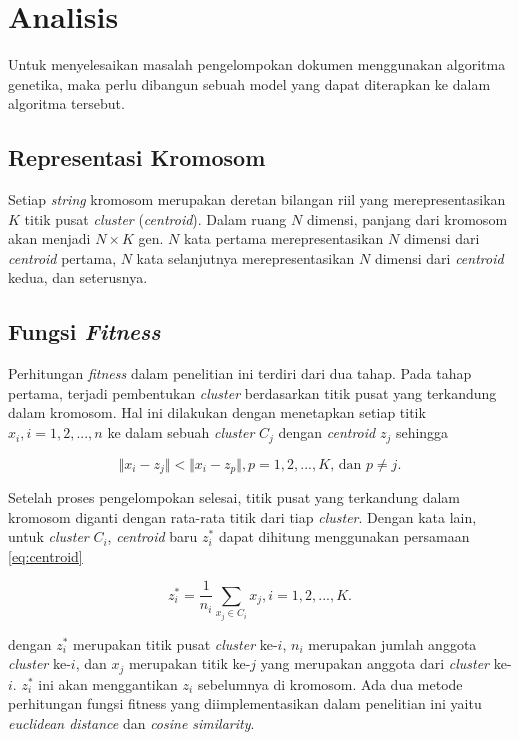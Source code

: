 \chapter{Analisis}
\label{chap:analisis}

Untuk menyelesaikan masalah pengelompokan dokumen menggunakan algoritma genetika, maka perlu dibangun sebuah model yang dapat diterapkan ke dalam algoritma tersebut.

\section{Representasi Kromosom}
Setiap \textit{string} kromosom merupakan deretan bilangan riil yang merepresentasikan $K$ titik pusat \textit{cluster} (\textit{centroid}). Dalam ruang $N$ dimensi, panjang dari kromosom akan menjadi $N\times K$ gen. $N$ kata pertama merepresentasikan $N$ dimensi dari \textit{centroid} pertama, $N$ kata selanjutnya merepresentasikan $N$ dimensi dari \textit{centroid} kedua, dan seterusnya.

\section{Fungsi \textit{Fitness}}
Perhitungan \textit{fitness} dalam penelitian ini terdiri dari dua tahap. Pada tahap pertama, terjadi pembentukan \textit{cluster} berdasarkan titik pusat yang terkandung dalam kromosom. Hal ini dilakukan dengan menetapkan setiap titik $x_i,i=1,2, ... ,n$ ke dalam sebuah \textit{cluster} $C_j$ dengan \textit{centroid} $z_j$ sehingga

\begin{equation}
\Vert x_i-z_j \Vert < \Vert x_i-z_p \Vert , p=1,2, ... ,K \mbox{, dan } p \neq j.
\end{equation}

Setelah proses pengelompokan selesai, titik pusat yang terkandung dalam kromosom diganti dengan rata-rata titik dari tiap \textit{cluster}. Dengan kata lain, untuk \textit{cluster} $C_i$, \textit{centroid} baru $z_i^*$ dapat dihitung menggunakan persamaan \ref{eq:centroid}

\begin{equation}
\label{eq:centroid}
z_i^*=\frac{1}{n_i} \sum_{x_j\in C_i} x_j,   i=1,2, ... ,K.
\end{equation}

dengan $z_i^*$ merupakan titik pusat \textit{cluster} ke-$i$, $n_i$ merupakan jumlah anggota \textit{cluster} ke-$i$, dan $x_j$ merupakan titik ke-$j$ yang merupakan anggota dari \textit{cluster} ke-$i$. $z_i^*$ ini akan menggantikan $z_i$ sebelumnya di kromosom. Ada dua metode perhitungan fungsi fitness yang diimplementasikan dalam penelitian ini yaitu \textit{euclidean distance} dan \textit{cosine similarity}.

